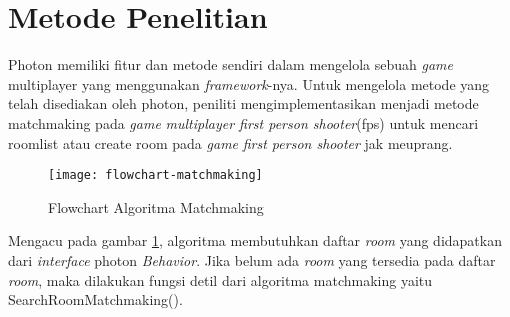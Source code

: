 \section{Metode Penelitian}
\noindent

Photon memiliki fitur dan metode sendiri dalam mengelola sebuah \textit{game} multiplayer yang menggunakan \textit{framework}-nya. Untuk mengelola metode yang telah disediakan oleh photon, peniliti mengimplementasikan menjadi metode matchmaking pada \textit{game} \textit{multiplayer first person shooter}(fps) untuk mencari roomlist atau create room pada \textit{game} \textit{first person shooter} jak meuprang.
        \begin{figure}[h]
         \centering
         \texttt{[image: flowchart-matchmaking]}
         \caption{Flowchart Algoritma Matchmaking}
         \label{fig:algoritmamatmaching}
         \end{figure}

Mengacu pada gambar \ref{fig:algoritmamatmaching}, algoritma membutuhkan daftar \textit{room} yang didapatkan dari \textit{interface} photon \textit{Behavior}. Jika belum ada \textit{room} yang tersedia pada daftar \textit{room}, maka dilakukan fungsi detil dari algoritma matchmaking yaitu SearchRoomMatchmaking(). 

    
    
    

